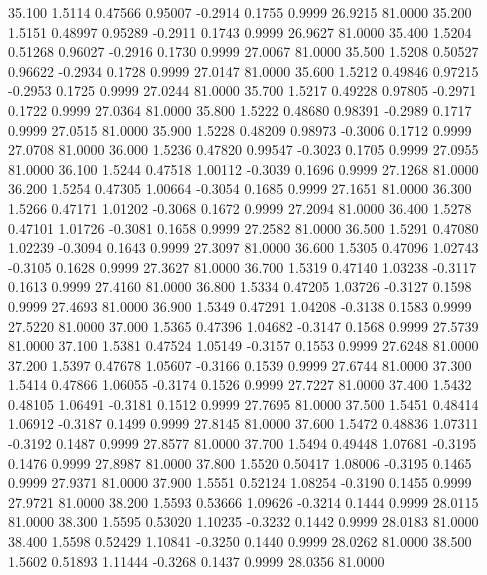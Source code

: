   35.100   1.5114   0.47566   0.95007  -0.2914   0.1755   0.9999  26.9215  81.0000
  35.200   1.5151   0.48997   0.95289  -0.2911   0.1743   0.9999  26.9627  81.0000
  35.400   1.5204   0.51268   0.96027  -0.2916   0.1730   0.9999  27.0067  81.0000
  35.500   1.5208   0.50527   0.96622  -0.2934   0.1728   0.9999  27.0147  81.0000
  35.600   1.5212   0.49846   0.97215  -0.2953   0.1725   0.9999  27.0244  81.0000
  35.700   1.5217   0.49228   0.97805  -0.2971   0.1722   0.9999  27.0364  81.0000
  35.800   1.5222   0.48680   0.98391  -0.2989   0.1717   0.9999  27.0515  81.0000
  35.900   1.5228   0.48209   0.98973  -0.3006   0.1712   0.9999  27.0708  81.0000
  36.000   1.5236   0.47820   0.99547  -0.3023   0.1705   0.9999  27.0955  81.0000
  36.100   1.5244   0.47518   1.00112  -0.3039   0.1696   0.9999  27.1268  81.0000
  36.200   1.5254   0.47305   1.00664  -0.3054   0.1685   0.9999  27.1651  81.0000
  36.300   1.5266   0.47171   1.01202  -0.3068   0.1672   0.9999  27.2094  81.0000
  36.400   1.5278   0.47101   1.01726  -0.3081   0.1658   0.9999  27.2582  81.0000
  36.500   1.5291   0.47080   1.02239  -0.3094   0.1643   0.9999  27.3097  81.0000
  36.600   1.5305   0.47096   1.02743  -0.3105   0.1628   0.9999  27.3627  81.0000
  36.700   1.5319   0.47140   1.03238  -0.3117   0.1613   0.9999  27.4160  81.0000
  36.800   1.5334   0.47205   1.03726  -0.3127   0.1598   0.9999  27.4693  81.0000
  36.900   1.5349   0.47291   1.04208  -0.3138   0.1583   0.9999  27.5220  81.0000
  37.000   1.5365   0.47396   1.04682  -0.3147   0.1568   0.9999  27.5739  81.0000
  37.100   1.5381   0.47524   1.05149  -0.3157   0.1553   0.9999  27.6248  81.0000
  37.200   1.5397   0.47678   1.05607  -0.3166   0.1539   0.9999  27.6744  81.0000
  37.300   1.5414   0.47866   1.06055  -0.3174   0.1526   0.9999  27.7227  81.0000
  37.400   1.5432   0.48105   1.06491  -0.3181   0.1512   0.9999  27.7695  81.0000
  37.500   1.5451   0.48414   1.06912  -0.3187   0.1499   0.9999  27.8145  81.0000
  37.600   1.5472   0.48836   1.07311  -0.3192   0.1487   0.9999  27.8577  81.0000
  37.700   1.5494   0.49448   1.07681  -0.3195   0.1476   0.9999  27.8987  81.0000
  37.800   1.5520   0.50417   1.08006  -0.3195   0.1465   0.9999  27.9371  81.0000
  37.900   1.5551   0.52124   1.08254  -0.3190   0.1455   0.9999  27.9721  81.0000
  38.200   1.5593   0.53666   1.09626  -0.3214   0.1444   0.9999  28.0115  81.0000
  38.300   1.5595   0.53020   1.10235  -0.3232   0.1442   0.9999  28.0183  81.0000
  38.400   1.5598   0.52429   1.10841  -0.3250   0.1440   0.9999  28.0262  81.0000
  38.500   1.5602   0.51893   1.11444  -0.3268   0.1437   0.9999  28.0356  81.0000
